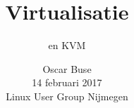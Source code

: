 \documentclass[t,11pt,handout,xcolor=table]{beamer}
\title{Virtualisatie}
\subtitle{en KVM}
\author{Oscar Buse\\
{\small 14 februari 2017\\
Linux User Group Nijmegen}}
\date{}
\begin{document}
    \begin{frontframe}
        \titlepage
    \end{frontframe}

    
\end{document}
